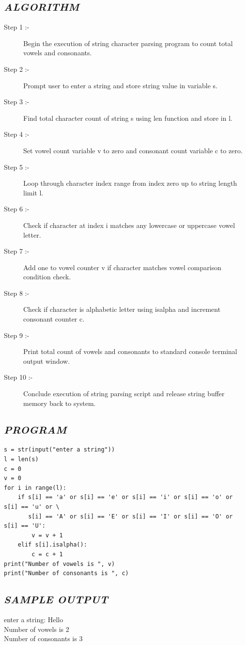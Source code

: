 \documentclass[11pt,a4paper]{article}
\begin{document}
\subsection*{\textit{ALGORITHM}}
\begin{description}
  \item[Step 1 :-] Begin the execution of string character parsing program to count total vowels and consonants.
  \item[Step 2 :-] Prompt user to enter a string and store string value in variable s.
  \item[Step 3 :-] Find total character count of string s using len function and store in l.
  \item[Step 4 :-] Set vowel count variable v to zero and consonant count variable c to zero.
  \item[Step 5 :-] Loop through character index range from index zero up to string length limit l.
  \item[Step 6 :-] Check if character at index i matches any lowercase or uppercase vowel letter.
  \item[Step 7 :-] Add one to vowel counter v if character matches vowel comparison condition check.
  \item[Step 8 :-] Check if character is alphabetic letter using isalpha and increment consonant counter c.
  \item[Step 9 :-] Print total count of vowels and consonants to standard console terminal output window.
  \item[Step 10 :-] Conclude execution of string parsing script and release string buffer memory back to system.
\end{description}

\subsection*{\textit{PROGRAM}}
\begin{lstlisting}[style=pythonstyle]
s = str(input("enter a string")) 
l = len(s) 
c = 0 
v = 0 
for i in range(l): 
    if s[i] == 'a' or s[i] == 'e' or s[i] == 'i' or s[i] == 'o' or s[i] == 'u' or \
       s[i] == 'A' or s[i] == 'E' or s[i] == 'I' or s[i] == 'O' or s[i] == 'U': 
        v = v + 1 
    elif s[i].isalpha(): 
        c = c + 1 
print("Number of vowels is ", v) 
print("Number of consonants is ", c)
\end{lstlisting}

\subsection*{\textit{SAMPLE OUTPUT}}
\begin{tcolorbox}[colback=black!85,colframe=navyblue,title=\textbf{Terminal Output},coltitle=white,fonttitle=\bfseries\small]
\small\ttfamily\color{green!30!white}
enter a string: Hello\\
Number of vowels is  2\\
Number of consonants is  3
\end{tcolorbox}
\end{document}
